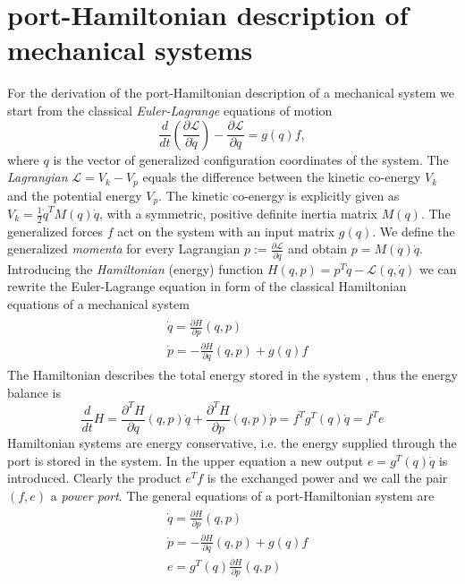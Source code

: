 \documentclass[a4paper,twoside, openright,12pt]{report}
\begin{document}
\section{port-Hamiltonian description of mechanical systems}\label{S:HSdescription}
For the derivation of the port-Hamiltonian description of a mechanical system we start from the classical \emph{Euler-Lagrange} equations of motion
\begin{equation}
\frac{d}{dt}\left(\frac{\partial \mathcal{L}}{\partial \dot{q}}\right) - \frac{\partial \mathcal{L}}{\partial q} = g(q)f,
\end{equation}
where $q$ is the vector of generalized configuration coordinates of the system. The \emph{Lagrangian} $\mathcal{L} = V_k - V_p$ equals the difference between the kinetic co-energy $V_k$ and the potential energy $V_p$. The kinetic co-energy is explicitly given as $V_k = \frac{1}{2} \dot{q}^T M(q) \dot{q}$, with a symmetric, positive definite inertia matrix $M(q)$. The generalized forces $f$ act on the system with an input matrix $g(q)$. We define the generalized \emph{momenta} for every Lagrangian $p := \frac{\partial \mathcal{L}}{\partial \dot{q}}$ and obtain $p = M(q)\dot{q}$.
Introducing the \emph{Hamiltonian} (energy) function $H(q,p) = p^T\dot{q} - \mathcal{L}(q,\dot{q})$ we can rewrite the Euler-Lagrange equation in form of the classical Hamiltonian equations of a mechanical system \begin{eqnarray}\label{EQ:generalPHS}
	\begin{aligned}
	& \dot{q} = \frac{\partial H}{\partial p}(q,p)\\
	& \dot{p} = -\frac{\partial H}{\partial q}(q,p) + g(q)f
	\end{aligned}
\end{eqnarray}
The Hamiltonian describes the total energy stored in the system \cite{vanderSchaft_06}, thus the energy balance is
\begin{equation}
	\frac{d}{dt}H = \frac{\partial^T H}{\partial q}(q,p)\dot{q} + \frac{\partial^T H}{\partial p}(q,p)\dot{p} = f^Tg^T(q)\dot{q} = f^Te
\end{equation}
Hamiltonian systems are energy conservative, i.e. the energy supplied through the port is stored in the system. In the upper equation a new output $e=g^T(q)\dot{q}$ is introduced. Clearly the product $e^Tf$ is the exchanged power and we call the pair $(f,e)$ a \emph{power port}.
The general equations of a port-Hamiltonian system are
\begin{eqnarray}
\begin{aligned}
	& \dot{q} = \frac{\partial H}{\partial p}(q,p)\\
	& \dot{p} = -\frac{\partial H}{\partial q}(q,p)+g(q)f \\   &e = g^T(q)\frac{\partial H}{\partial p}(q,p)
\end{aligned}	
\end{eqnarray}
\end{document}
